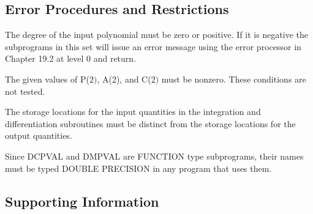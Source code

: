 \documentclass[twoside]{MATH77}
\begin{document}
\subsection{Error Procedures and Restrictions}

The degree of the input polynomial must be zero or positive. If it is
negative the subprograms in this set will issue an error message
using the error processor in Chapter 19.2 at level 0 and
return.

The given values of P($2)$, A(2), and C($2)$ must be nonzero.  These
conditions are not tested.

The storage locations for the input quantities in the integration and
differentiation subroutines must be distinct from the storage locations for
the output quantities.

Since DCPVAL and DMPVAL are FUNCTION type subprograms, their names must be
typed DOUBLE PRECISION in any program that uses them.

\subsection{Supporting Information}
\end{document}
